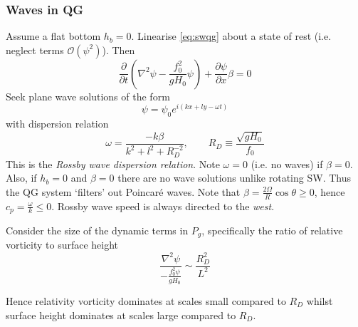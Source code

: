 \documentclass{jknotes}
\begin{document}
\subsubsection{Waves in QG}
Assume a flat bottom $h_b = 0$. Linearise \eqref{eq:swqg} about a state of
rest (i.e. neglect terms $\mathcal{O}(\psi^2)$). Then
\begin{equation}
	\frac{\partial}{\partial t} \left( \nabla^2 \psi - \frac{f_0^2}{gH_0}
	\psi\right) + \frac{\partial \psi}{\partial x}\beta = 0
\end{equation}
Seek plane wave solutions of the form
\begin{equation}
	\psi = \psi_0 e^{i(kx + ly - \omega t)}
\end{equation}
with dispersion relation
\begin{equation}
	\omega = \frac{-k \beta}{k^2 + l^2 + R_D^{-2}}, \hspace{2em} R_D \equiv
	\frac{\sqrt{gH_0}}{f_0}
\end{equation}
This is the \emph{Rossby wave dispersion relation}. Note $\omega = 0$ (i.e. no
waves) if $\beta = 0$. Also, if $h_b = 0$ and $\beta = 0$ there are no wave
solutions unlike rotating SW. Thus the QG system `filters' out Poincar\'{e}
waves. Note that $\beta = \frac{2 \Omega}{R} \cos \theta \ge 0$, hence $c_p =
\frac{\omega}{k} \le 0$. Rossby wave speed is always directed to the
\emph{west}.

Consider the size of the dynamic terms in $P_g$, specifically the ratio of
relative vorticity to surface height
\begin{equation}
	\frac{\nabla^2 \psi}{-\frac{f_0^2 \psi}{g H_0}} \sim \frac{R_D^2}{L^2}
\end{equation}

Hence relativity vorticity dominates at scales small compared to $R_D$ whilst
surface height dominates at scales large compared to $R_D$.
\end{document}
